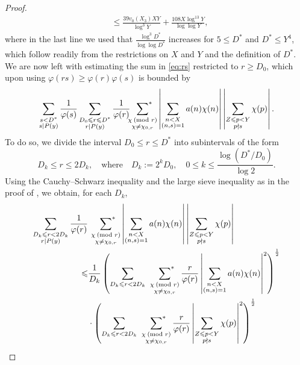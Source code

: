 \documentclass[12pt]{amsart}
\begin{document}
\begin{proof}
\begin{align}
&\le\frac{39v_0(X_3)XY}{\log^3 Y}+\frac{108X\log^{13}Y}{\log\log Y},
\end{align}
where in the last line we used that $\frac{\log^3 D^*}{\log \log D^*}$ increases for $5 \le D^*$ and $D^*\le Y^4$, which follow readily from the restrictions on $X$ and $Y$ and the definition of $D^*$.
We are now left with estimating the sum in \eqref{eq:rs} restricted to $r \ge D_0$, which upon using $\varphi(rs)\ge\varphi(r)\varphi(s)$ is bounded by
\begin{equation*}
\sum_{\substack{s<D^*\\s\mid P(y)}}\frac{1}{\varphi(s)} \sum_{\substack{ D_0\le r \le D^*\\r\mid P(y) }}\frac{1}{\varphi(r)}\sideset{}{^{*}}\sum_{\substack{\chi\: (\text{mod }r)\\\chi\neq\chi_{0,r}}}\left|\sum_{\substack{n<X\\ (n,s)=1}}a(n) \chi(n) \right|\left|\sum_{\substack{Z\le p <Y \\ p\nmid s}}\chi(p) \right|.
\end{equation*} 
To do so, we divide the interval $D_0\le r \le D^*$ into subintervals of the form 
\begin{equation*}
D_k \le r \le 2D_k, \quad \text{where} \quad D_k:=2^kD_0, \quad 0 \le k \le \frac{\log (D^*/D_0)}{\log 2}.
\end{equation*}
Using the Cauchy--Schwarz inequality and the large sieve inequality  \cite[p. 160]{Davenport} as in the proof of \cite[Theorem 10.7]{Nathanson}, we obtain, for each $D_k$, 
\begin{align*}
 \sum_{\substack{ D_k\le r < 2D_k \\r\mid P(y)}}\frac{1}{\varphi(r)} &\ \ \sideset{}{^{*}}\sum_{\substack{\chi\: (\text{mod }r)\\\chi\neq\chi_{0,r}}}\left|\sum_{\substack{n<X\\ (n,s)=1}}a(n) \chi(n) \right|\left|\sum_{\substack{Z\le p <Y \\ p\nmid s}}\chi(p) \right| 
 \\
  \le & \frac{1}{D_k}\left( \sum_{D_k\le r < 2D_k}\ \ \sideset{}{^{*}}\sum_{\substack{\chi\: (\text{mod }r)\\\chi\neq\chi_{0,r}}}\frac{r}{\varphi(r)} \left|\sum_{\substack{n<X\\ (n,s)=1}}a(n) \chi(n) \right|^2\right)^{\frac{1}{2}} 
  \\&
 \cdot \left( \sum_{D_k\le r < 2D_k}\ \ \sideset{}{^{*}}\sum_{\substack{\chi\: (\text{mod }r)\\\chi\neq\chi_{0,r}}}\frac{r}{\varphi(r)} \left|\sum_{\substack{Z\le p <Y \\ p\nmid s}}\chi(p) \right|^2\right)^{\frac{1}{2}} 

\end{align*}
\end{proof}
\end{document}
